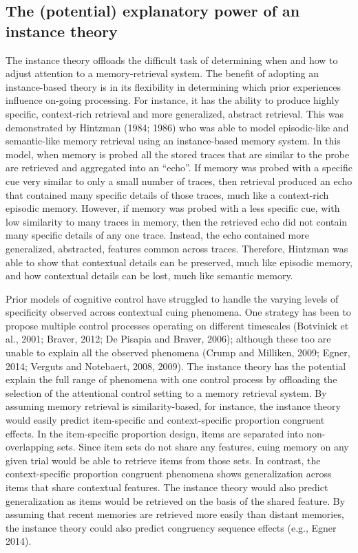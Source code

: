 \documentclass[]{DissertateCUNY}
\begin{document}
\hypertarget{the-potential-explanatory-power-of-an-instance-theory}{%
\subsection{The (potential) explanatory power of an instance
theory}\label{the-potential-explanatory-power-of-an-instance-theory}}

The instance theory offloads the difficult task of determining when and
how to adjust attention to a memory-retrieval system. The benefit of
adopting an instance-based theory is in its flexibility in determining
which prior experiences influence on-going processing. For instance, it
has the ability to produce highly specific, context-rich retrieval and
more generalized, abstract retrieval. This was demonstrated by Hintzman
(1984; 1986) who was able to model episodic-like and semantic-like
memory retrieval using an instance-based memory system. In this model,
when memory is probed all the stored traces that are similar to the
probe are retrieved and aggregated into an ``echo''. If memory was
probed with a specific cue very similar to only a small number of
traces, then retrieval produced an echo that contained many specific
details of those traces, much like a context-rich episodic memory.
However, if memory was probed with a less specific cue, with low
similarity to many traces in memory, then the retrieved echo did not
contain many specific details of any one trace. Instead, the echo
contained more generalized, abstracted, features common across traces.
Therefore, Hintzman was able to show that contextual details can be
preserved, much like episodic memory, and how contextual details can be
lost, much like semantic memory.

Prior models of cognitive control have struggled to handle the varying
levels of specificity observed across contextual cuing phenomena. One
strategy has been to propose multiple control processes operating on
different timescales (Botvinick et al., 2001; Braver, 2012; De Pisapia
and Braver, 2006); although these too are unable to explain all the
observed phenomena (Crump and Milliken, 2009; Egner, 2014; Verguts and
Notebaert, 2008, 2009). The instance theory has the potential explain
the full range of phenomena with one control process by offloading the
selection of the attentional control setting to a memory retrieval
system. By assuming memory retrieval is similarity-based, for instance,
the instance theory would easily predict item-specific and
context-specific proportion congruent effects. In the item-specific
proportion design, items are separated into non-overlapping sets. Since
item sets do not share any features, cuing memory on any given trial
would be able to retrieve items from those sets. In contrast, the
context-specific proportion congruent phenomena shows generalization
across items that share contextual features. The instance theory would
also predict generalization as items would be retrieved on the basis of
the shared feature. By assuming that recent memories are retrieved more
easily than distant memories, the instance theory could also predict
congruency sequence effects (e.g., Egner 2014).
\end{document}

